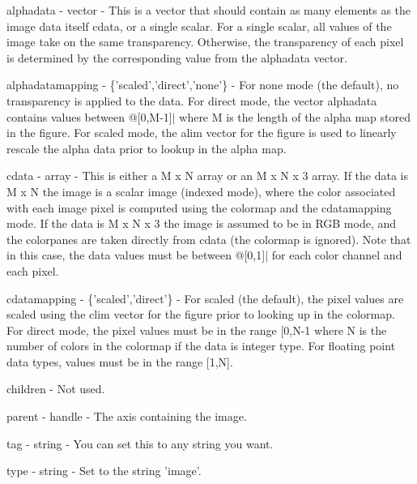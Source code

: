 \begin{DoxyItemize}
\item {\ttfamily alphadata} -\/ {\ttfamily vector} -\/ This is a vector that should contain as many elements as the image data itself {\ttfamily cdata}, or a single scalar. For a single scalar, all values of the image take on the same transparency. Otherwise, the transparency of each pixel is determined by the corresponding value from the {\ttfamily alphadata} vector.  
\item {\ttfamily alphadatamapping} -\/ {\ttfamily \{'scaled','direct','none'\}} -\/ For {\ttfamily none} mode (the default), no transparency is applied to the data. For {\ttfamily direct} mode, the vector {\ttfamily alphadata} contains values between @\mbox{[}0,M-\/1\mbox{]}$|$ where {\ttfamily M} is the length of the alpha map stored in the figure. For {\ttfamily scaled} mode, the {\ttfamily alim} vector for the figure is used to linearly rescale the alpha data prior to lookup in the alpha map.  
\item {\ttfamily cdata} -\/ {\ttfamily array} -\/ This is either a {\ttfamily M x N} array or an {\ttfamily M x N x 3} array. If the data is {\ttfamily M x N} the image is a scalar image (indexed mode), where the color associated with each image pixel is computed using the colormap and the {\ttfamily cdatamapping} mode. If the data is {\ttfamily M x N x 3} the image is assumed to be in R\-G\-B mode, and the colorpanes are taken directly from {\ttfamily cdata} (the colormap is ignored). Note that in this case, the data values must be between @\mbox{[}0,1\mbox{]}$|$ for each color channel and each pixel.  
\item {\ttfamily cdatamapping} -\/ {\ttfamily \{'scaled','direct'\}} -\/ For {\ttfamily scaled} (the default), the pixel values are scaled using the {\ttfamily clim} vector for the figure prior to looking up in the colormap. For {\ttfamily direct} mode, the pixel values must be in the range {\ttfamily \mbox{[}0,N-\/1} where {\ttfamily N} is the number of colors in the colormap if the data is integer type. For floating point data types, values must be in the range {\ttfamily \mbox{[}1,N\mbox{]}}.  
\item {\ttfamily children} -\/ Not used.  
\item {\ttfamily parent} -\/ {\ttfamily handle} -\/ The axis containing the image.  
\item {\ttfamily tag} -\/ {\ttfamily string} -\/ You can set this to any string you want.  
\item {\ttfamily type} -\/ {\ttfamily string} -\/ Set to the string {\ttfamily 'image'}.  

\end{DoxyItemize}
